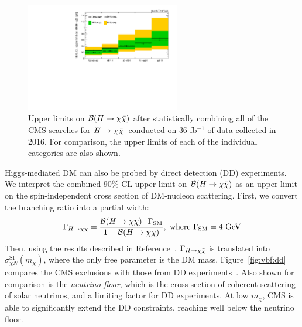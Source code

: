 \begin{figure}[]
    \begin{center}
        \includegraphics[width=0.6\textwidth]{figures/vbf/fits/comb.pdf}
        \caption{Upper limits on $\mathcal{B}(H\rightarrow\chi\bar\chi)$ after statistically combining all of the CMS searches for $H\rightarrow\chi\bar\chi$~conducted on $36$ fb$^{-1}$ of data collected in 2016.
                 For comparison, the upper limits of each of the individual categories are also shown.}
        \label{fig:vbf:comb}
    \end{center}
\end{figure}

Higgs-mediated DM can also be probed by direct detection (DD) experiments.
We interpret the combined 90\% CL upper limit on $\mathcal{B}(H\rightarrow\chi\bar\chi)$ as an upper limit on the spin-independent cross section of DM-nucleon scattering. 
First, we convert the branching ratio into a partial width:
\begin{equation}
    \Gamma_{H\rightarrow\chi\bar\chi} = \frac{\mathcal{B}(H\rightarrow\chi\bar\chi) \cdot \Gamma_\mathrm{SM}}{1 - \mathcal{B}(H\rightarrow\chi\bar\chi)}, \text{ where }\Gamma_\mathrm{SM} = 4~\mathrm{GeV}
\end{equation}
Then, using the results described in Reference~\cite{higgsdm3}, $\Gamma_{H\rightarrow\chi\bar\chi}$ is translated into $\sigma^{\mathrm{SI}}_{\chi N}(m_\chi)$, where the only free parameter is the DM mass.
Figure~\ref{fig:vbf:dd} compares the CMS exclusions with those from DD experiments~\needcite.
Also shown for comparison is the \emph{neutrino floor}, which is the cross section of coherent scattering of solar neutrinos, and a limiting factor for DD experiments.
At low $m_\chi$, CMS is able to significantly extend the DD constraints, reaching well below the neutrino floor. 

